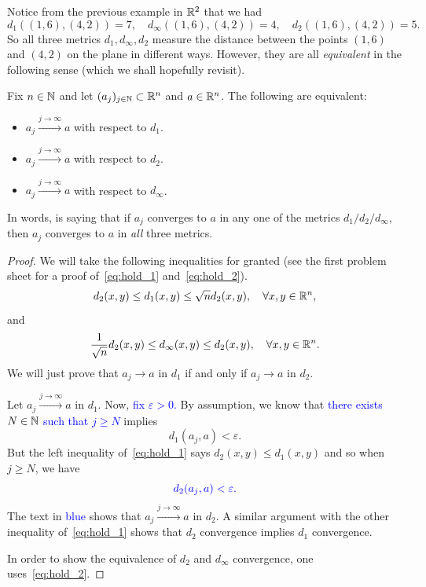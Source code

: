 Notice from the previous example in $\mathbb{R}^2$ that we had
\[
d_1((1,6),(4,2)) = 7,\quad d_\infty((1,6),(4,2)) = 4,\quad d_2((1,6),(4,2)) = 5.
\]
So all three metrics $d_1,d_\infty, d_2$ measure the distance between the points $(1,6)$ and $(4,2)$ on the plane in different ways. However, they are all \textit{equivalent} in the following sense (which we shall hopefully revisit).
\begin{prop}
\label{prop:equiv_d12inf}
Fix $n\in\mathbb{N}$ and let $(a_j)_{j\in\mathbb{N}}\subset \mathbb{R}^n$ and $a\in \mathbb{R}^n$. The following are equivalent:
\begin{itemize}
	\item $a_j\overset{j\to \infty}{\to}a$ with respect to $d_1$.
	\item $a_j\overset{j\to \infty}{\to}a$ with respect to $d_2$.
	\item $a_j\overset{j\to \infty}{\to}a$ with respect to $d_\infty$.
\end{itemize}
\end{prop}
In words,  is saying that if $a_j$ converges to $a$ in any one of the metrics $d_1 / d_2 / d_\infty$, then $a_j$ converges to $a$ in \textit{all} three metrics.
\begin{proof}
We will take the following inequalities for granted (see the first problem sheet for a proof of~\eqref{eq:hold_1} and~\eqref{eq:hold_2}).
\begin{equation}
	\label{eq:hold_1}
	d_2(x,y) \le d_1(x,y)\le \sqrt{n} d_2(x,y),\quad \forall x,y\in\mathbb{R}^n,
\end{equation}
and
\begin{equation}
	\label{eq:hold_2}
	\frac{1}{\sqrt{n}}d_2(x,y)\le d_\infty(x,y)\le d_2(x,y),\quad\forall x,y\in\mathbb{R}^n.
\end{equation}
We will just prove that $a_j \to a$ in $d_1$ if and only if $a_j\to a$ in $d_2$.

Let $a_j\overset{j\to \infty}{\to}a$ in $d_1$. Now, \textcolor{blue}{fix $\varepsilon>0$.} By assumption, we know that \textcolor{blue}{there exists $N\in\mathbb{N}$ such that $j\ge N$} implies
\[
d_1(a_j,a)<\varepsilon.
\]
But the left inequality of~\eqref{eq:hold_1} says $d_2(x,y)\le d_1(x,y)$ and so when $j\ge N$, we have
\[
{\color{blue}
d_2(a_j,a)<\varepsilon.
}
\]
The text in \textcolor{blue}{blue} shows that $a_j \overset{j\to \infty}{\to} a$ in $d_2$. A similar argument with the other inequality of~\eqref{eq:hold_1} shows that $d_2$ convergence implies $d_1$ convergence.

In order to show the equivalence of $d_2$ and $d_\infty$ convergence, one uses~\eqref{eq:hold_2}.
\end{proof}
